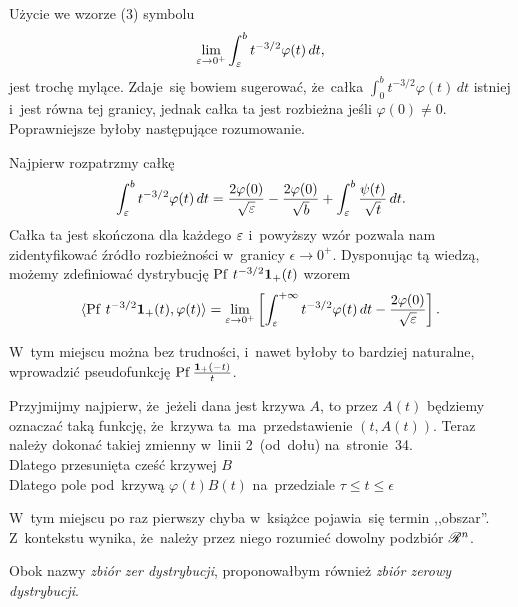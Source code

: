 \documentclass[a4paper,11pt]{article}
\begin{document}
\start {} Użycie we wzorze (3) symbolu
\begin{equation}
  \label{eq:Zem-s01-01}
  \lim\limits_{ \varepsilon \to 0^{ + } } \int_{ \varepsilon }^{ b } t^{ -3/2 } \varphi( t ) \, dt,
\end{equation}
jest trochę mylące. Zdaje~się bowiem sugerować, że~całka
$\int_{ 0 }^{ b } t^{ -3/2 } \varphi( t ) \, dt$ istniej i~jest równa tej
granicy, jednak całka ta jest rozbieżna jeśli $\varphi( 0 ) \neq 0$.
Poprawniejsze byłoby następujące
rozumowanie. %

Najpierw rozpatrzmy całkę
\begin{equation}
  \label{eq:Zem-s01-02}
  \int_{ \varepsilon }^{ b } t^{ -3/2 } \varphi( t ) \, dt
  = \frac{ 2 \varphi( 0 ) }{ \sqrt{ \varepsilon } } - \frac{ 2 \varphi( 0 ) }{ \sqrt{ b } }
  + \int_{ \varepsilon }^{ b } \frac{ \psi( t ) }{ \sqrt{ t } } \, dt.
\end{equation}
Całka ta jest skończona dla każdego $\varepsilon$ i~powyższy wzór pozwala
nam zidentyfikować źródło rozbieżności w~granicy $\epsilon \to 0^{ + }$.
Dysponując tą wiedzą, możemy zdefiniować dystrybucję
$\mathrm{Pf}\, \, t^{ -3/2 } \mathbf{1}_{ + }( t )$ wzorem
\begin{equation}
  \label{eq:Zem-s01-03}
  \langle \mathrm{Pf}\, \, t^{ -3/2 } \mathbf{1}_{ + }( t ), \varphi( t ) \rangle = \lim\limits_{ \varepsilon \to 0^{ + } }
  \left[ \int_{ \varepsilon }^{ +\infty } t^{ -3/2 } \varphi( t ) \, dt
    - \frac{ 2 \varphi( 0 ) }{ \sqrt{ \varepsilon } } \right].
\end{equation}

\start {} W~tym miejscu można bez trudności, i~nawet byłoby to
bardziej naturalne, wprowadzić pseudofunkcję
$\mathrm{Pf}\, \frac{ \mathbf{1}_{ + }( -t ) }{ t }$.

\start {} Przyjmijmy najpierw, że~jeżeli dana jest krzywa
$A$, to przez $A( t )$ będziemy oznaczać taką funkcję, że~krzywa
ta~ma~przedstawienie $( t, A( t ) )$. Teraz należy dokonać takiej
zmienny w~linii 2~(od~dołu) na~stronie~34. \\
\Jest Dlatego przesunięta cześć krzywej $B$ \\
\Powin Dlatego pole pod~krzywą $\varphi( t ) B( t )$ na~przedziale
$\tau \leq t \leq \epsilon$

\start {} W~tym miejscu po raz pierwszy chyba w~książce
pojawia~się termin ,,obszar''. Z~kontekstu wynika, że~należy przez
niego rozumieć dowolny podzbiór $\mathcal{R}^{ n }$.

\start {} Obok nazwy \emph{zbiór zer dystrybucji}, proponowałbym
również \emph{zbiór zerowy dystrybucji}.
\end{document}
